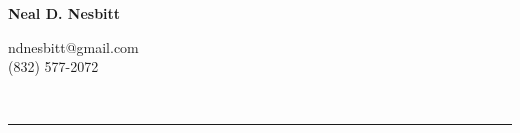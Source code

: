 \documentclass[10pt]{article}
\begin{document}
\noindent
\begin{minipage}[l]{0.58\textwidth}
\Huge \bf Neal D. Nesbitt
\end{minipage}
\hfill
\begin{minipage}[r]{0.38\textwidth}
\raggedleft
ndnesbitt@gmail.com\\
(832) 577-2072
\end{minipage}\\

\hrule





\end{document}
